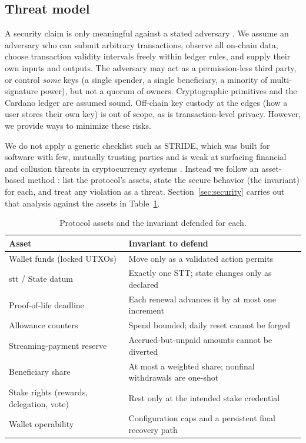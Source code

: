 \documentclass[11pt,DIV=11,parskip=half-]{scrartcl}
\begin{document}
\subsection{Threat model}
A security claim is only meaningful against a stated adversary \cite{ncscProtocol}. We assume an adversary who can submit arbitrary transactions, observe all on-chain data, choose transaction validity intervals freely within ledger rules, and supply their own inputs and outputs. The adversary may act as a permission-less third party, or control \emph{some} keys (a single spender, a single beneficiary, a minority of multi-signature power), but not a quorum of owners. Cryptographic primitives and the Cardano ledger are assumed sound. Off-chain key custody at the edges (how a user stores their own key) is out of scope, as is transaction-level privacy. However, we provide ways to minimize these risks.

We do not apply a generic checklist such as STRIDE, which was built for software with few, mutually trusting parties and is weak at surfacing financial and collusion threats in cryptocurrency systems \cite{abcThreatModel}. Instead we follow an asset-based method \cite{abcThreatModel}: list the protocol's assets, state the secure behavior (the invariant) for each, and treat any violation as a threat. Section~\ref{sec:security} carries out that analysis against the assets in Table~\ref{tab:assets}.

\begin{table}[h]
\centering\small
\begin{tabular}{@{}ll@{}}
\toprule
\textbf{Asset} & \textbf{Invariant to defend} \\
\midrule
Wallet funds (locked UTXOs) & Move only as a validated action permits \\
\gls{stt} / State datum & Exactly one STT; state changes only as declared \\
Proof-of-life deadline & Each renewal advances it by at most one increment \\
Allowance counters & Spend bounded; daily reset cannot be forged \\
Streaming-payment reserve & Accrued-but-unpaid amounts cannot be diverted \\
Beneficiary share & At most a weighted share; nonfinal withdrawals are one-shot \\
Stake rights (rewards, delegation, vote) & Rest only at the intended stake credential \\
Wallet operability & Configuration caps and a persistent final recovery path \\
\bottomrule
\end{tabular}
\caption{Protocol assets and the invariant defended for each.}
\label{tab:assets}
\end{table}
\end{document}
